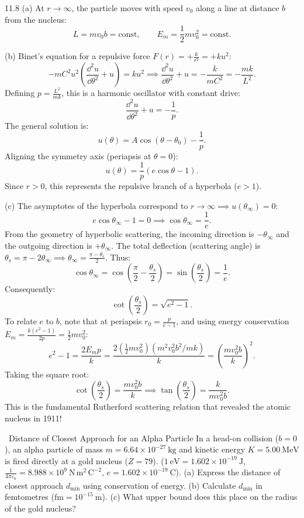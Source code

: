 \begin{tabletworkspace}[6.5cm]
\end{tabletworkspace}

\begin{solution}{11.8}
(a) At $r \to \infty$, the particle moves with speed $v_0$ along a line at distance $b$ from the nucleus:
\[
L = m v_0 b = \text{const},\qquad E_m = \frac{1}{2}m v_0^2 = \text{const}.
\]

(b) Binet's equation for a repulsive force $F(r) = +\frac{k}{r^2} = +k u^2$:
\[
-m C^2 u^2\left(\frac{\dd^2 u}{\dd\theta^2} + u\right) = k u^2 \implies \frac{\dd^2 u}{\dd\theta^2} + u = -\frac{k}{m C^2} = -\frac{mk}{L^2}.
\]
Defining $p = \frac{L^2}{mk}$, this is a harmonic oscillator with constant drive:
\[
\frac{\dd^2 u}{\dd\theta^2} + u = -\frac{1}{p}.
\]
The general solution is:
\[
u(\theta) = A\cos(\theta - \theta_0) - \frac{1}{p}.
\]
Aligning the symmetry axis (periapsis at $\theta = 0$):
\[
u(\theta) = \frac{1}{p}\left(e\cos\theta - 1\right).
\]
Since $r > 0$, this represents the repulsive branch of a hyperbola ($e > 1$).

(c) The asymptotes of the hyperbola correspond to $r \to \infty \implies u(\theta_\infty) = 0$:
\[
e\cos\theta_\infty - 1 = 0 \implies \cos\theta_\infty = \frac{1}{e}.
\]
From the geometry of hyperbolic scattering, the incoming direction is $-\theta_\infty$ and the outgoing direction is $+\theta_\infty$.
The total deflection (scattering angle) is $\theta_s = \pi - 2\theta_\infty \implies \theta_\infty = \frac{\pi - \theta_s}{2}$.
Thus:
\[
\cos\theta_\infty = \cos\left(\frac{\pi}{2} - \frac{\theta_s}{2}\right) = \sin\left(\frac{\theta_s}{2}\right) = \frac{1}{e}.
\]
Consequently:
\[
\cot\left(\frac{\theta_s}{2}\right) = \sqrt{e^2 - 1}.
\]
To relate $e$ to $b$, note that at periapsis $r_0 = \frac{p}{e - 1}$, and using energy conservation $E_m = \frac{k(e^2 - 1)}{2p} = \frac{1}{2}m v_0^2$:
\[
e^2 - 1 = \frac{2 E_m p}{k} = \frac{2(\frac{1}{2}m v_0^2)(m^2 v_0^2 b^2 / mk)}{k} = \left(\frac{m v_0^2 b}{k}\right)^2.
\]
Taking the square root:
\[
\cot\left(\frac{\theta_s}{2}\right) = \frac{m v_0^2 b}{k} \implies \boxed{\tan\left(\frac{\theta_s}{2}\right) = \frac{k}{m v_0^2 b}.}
\]
This is the fundamental Rutherford scattering relation that revealed the atomic nucleus in 1911!
\end{solution}

\begin{exercise}{\mastery\ Distance of Closest Approach for an Alpha Particle}
In a head-on collision ($b = 0$), an alpha particle of mass $m = 6.64\times 10^{-27}\ \mathrm{kg}$ and kinetic energy $K = 5.00\ \mathrm{MeV}$ is fired directly at a gold nucleus ($Z = 79$).
($1\ \mathrm{eV} = 1.602\times 10^{-19}\ \mathrm{J}$, $\frac{1}{4\pi\varepsilon_0} = 8.988\times 10^9\ \mathrm{N\,m^2\,C^{-2}}$, $e = 1.602\times 10^{-19}\ \mathrm{C}$).
(a) Express the distance of closest approach $d_{\min}$ using conservation of energy.
(b) Calculate $d_{\min}$ in femtometres ($\mathrm{fm} = 10^{-15}\ \mathrm{m}$).
(c) What upper bound does this place on the radius of the gold nucleus?
\end{exercise}

